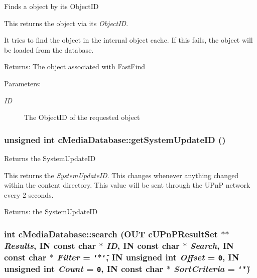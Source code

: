 Finds a object by its ObjectID

This returns the object via its {\em ObjectID\/}.

It tries to find the object in the internal object cache. If this fails, the object will be loaded from the database.

\begin{Desc}
\item[Returns:]The object associated with FastFind \end{Desc}
\begin{Desc}
\item[Parameters:]
\begin{description}
\item[{\em ID}]The ObjectID of the requested object \end{description}
\end{Desc}
\hypertarget{classcMediaDatabase_96232caa30b80d4e3ca667c317101fd0}{
\subsubsection[{getSystemUpdateID}]{\setlength{\rightskip}{0pt plus 5cm}unsigned int cMediaDatabase::getSystemUpdateID ()}}
\label{classcMediaDatabase_96232caa30b80d4e3ca667c317101fd0}


Returns the SystemUpdateID

This returns the {\em SystemUpdateID\/}. This changes whenever anything changed within the content directory. This value will be sent through the UPnP network every 2 seconds.

\begin{Desc}
\item[Returns:]the SystemUpdateID \end{Desc}
\hypertarget{classcMediaDatabase_36bdc240d3fa11d685440d365d9ab8c9}{
\subsubsection[{search}]{\setlength{\rightskip}{0pt plus 5cm}int cMediaDatabase::search (OUT {\bf cUPnPResultSet} $\ast$$\ast$ {\em Results}, \/  IN const char $\ast$ {\em ID}, \/  IN const char $\ast$ {\em Search}, \/  IN const char $\ast$ {\em Filter} = {\tt \char`\"{}$\ast$\char`\"{}}, \/  IN unsigned int {\em Offset} = {\tt 0}, \/  IN unsigned int {\em Count} = {\tt 0}, \/  IN const char $\ast$ {\em SortCriteria} = {\tt \char`\"{}\char`\"{}})}}
\label{classcMediaDatabase_36bdc240d3fa11d685440d365d9ab8c9}


